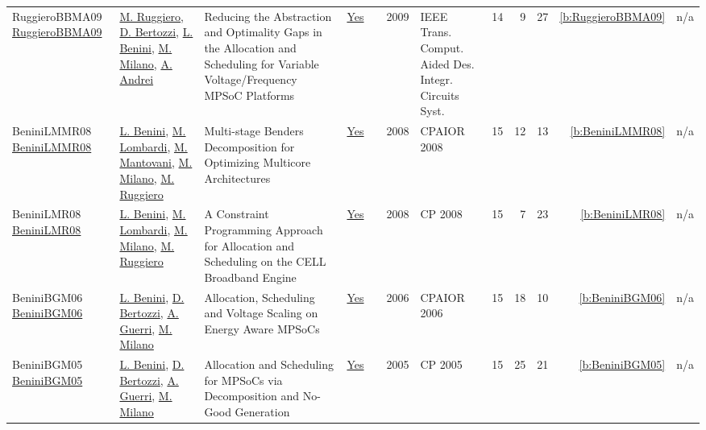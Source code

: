 {\begin{longtable}{>{\raggedright\arraybackslash}p{3cm}>{\raggedright\arraybackslash}p{6cm}>{\raggedright\arraybackslash}p{6.5cm}rrrp{2.5cm}rrrrr}
RuggieroBBMA09 \href{https://doi.org/10.1109/TCAD.2009.2013536}{RuggieroBBMA09} & \hyperref[auth:a724]{M. Ruggiero}, \hyperref[auth:a378]{D. Bertozzi}, \hyperref[auth:a247]{L. Benini}, \hyperref[auth:a144]{M. Milano}, \hyperref[auth:a725]{A. Andrei} & Reducing the Abstraction and Optimality Gaps in the Allocation and Scheduling for Variable Voltage/Frequency MPSoC Platforms & \href{../works/RuggieroBBMA09.pdf}{Yes} & \cite{RuggieroBBMA09} & 2009 & {IEEE} Trans. Comput. Aided Des. Integr. Circuits Syst. & 14 & 9 & 27 & \ref{b:RuggieroBBMA09} & n/a\\
BeniniLMMR08 \href{https://doi.org/10.1007/978-3-540-68155-7_6}{BeniniLMMR08} & \hyperref[auth:a247]{L. Benini}, \hyperref[auth:a143]{M. Lombardi}, \hyperref[auth:a1168]{M. Mantovani}, \hyperref[auth:a144]{M. Milano}, \hyperref[auth:a724]{M. Ruggiero} & Multi-stage Benders Decomposition for Optimizing Multicore Architectures & \href{../works/BeniniLMMR08.pdf}{Yes} & \cite{BeniniLMMR08} & 2008 & CPAIOR 2008 & 15 & 12 & 13 & \ref{b:BeniniLMMR08} & n/a\\
BeniniLMR08 \href{http://dx.doi.org/10.1007/978-3-540-85958-1_2}{BeniniLMR08} & \hyperref[auth:a247]{L. Benini}, \hyperref[auth:a143]{M. Lombardi}, \hyperref[auth:a144]{M. Milano}, \hyperref[auth:a724]{M. Ruggiero} & A Constraint Programming Approach for Allocation and Scheduling on the CELL Broadband Engine & \href{../works/BeniniLMR08.pdf}{Yes} & \cite{BeniniLMR08} & 2008 & CP 2008 & 15 & 7 & 23 & \ref{b:BeniniLMR08} & n/a\\
BeniniBGM06 \href{https://doi.org/10.1007/11757375_6}{BeniniBGM06} & \hyperref[auth:a247]{L. Benini}, \hyperref[auth:a378]{D. Bertozzi}, \hyperref[auth:a379]{A. Guerri}, \hyperref[auth:a144]{M. Milano} & Allocation, Scheduling and Voltage Scaling on Energy Aware MPSoCs & \href{../works/BeniniBGM06.pdf}{Yes} & \cite{BeniniBGM06} & 2006 & CPAIOR 2006 & 15 & 18 & 10 & \ref{b:BeniniBGM06} & n/a\\
BeniniBGM05 \href{https://doi.org/10.1007/11564751_11}{BeniniBGM05} & \hyperref[auth:a247]{L. Benini}, \hyperref[auth:a378]{D. Bertozzi}, \hyperref[auth:a379]{A. Guerri}, \hyperref[auth:a144]{M. Milano} & Allocation and Scheduling for MPSoCs via Decomposition and No-Good Generation & \href{../works/BeniniBGM05.pdf}{Yes} & \cite{BeniniBGM05} & 2005 & CP 2005 & 15 & 25 & 21 & \ref{b:BeniniBGM05} & n/a\\
\end{longtable}
}

\clearpage

